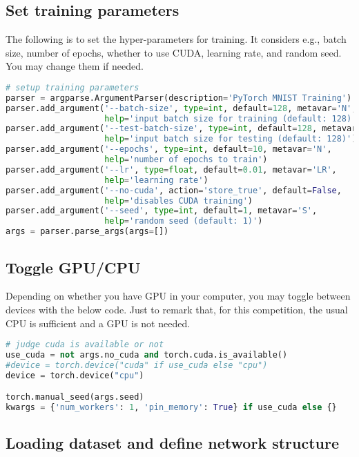 \subsection*{Set training parameters}

The following is to set the hyper-parameters for training. It considers e.g., batch size, number of epochs, whether to use CUDA, learning rate, and random seed. You may change them if needed. 

\begin{lstlisting}[language=Python]
# setup training parameters
parser = argparse.ArgumentParser(description='PyTorch MNIST Training')
parser.add_argument('--batch-size', type=int, default=128, metavar='N',
                    help='input batch size for training (default: 128)')
parser.add_argument('--test-batch-size', type=int, default=128, metavar='N',
                    help='input batch size for testing (default: 128)')
parser.add_argument('--epochs', type=int, default=10, metavar='N',
                    help='number of epochs to train')
parser.add_argument('--lr', type=float, default=0.01, metavar='LR',
                    help='learning rate')
parser.add_argument('--no-cuda', action='store_true', default=False,
                    help='disables CUDA training')
parser.add_argument('--seed', type=int, default=1, metavar='S',
                    help='random seed (default: 1)')
args = parser.parse_args(args=[]) 
\end{lstlisting}

\subsection*{Toggle GPU/CPU}

Depending on whether you have GPU in your computer, you may toggle between devices with the below code. Just to remark that, for this competition, the usual CPU is sufficient and a GPU is not needed. 

\begin{lstlisting}[language=Python]
# judge cuda is available or not
use_cuda = not args.no_cuda and torch.cuda.is_available()
#device = torch.device("cuda" if use_cuda else "cpu")
device = torch.device("cpu")

torch.manual_seed(args.seed)
kwargs = {'num_workers': 1, 'pin_memory': True} if use_cuda else {}
\end{lstlisting}


\subsection*{Loading dataset and define network structure}

